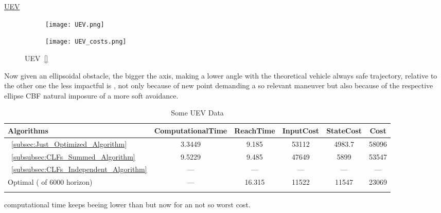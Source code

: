  \newpage %

\underline{UEV}
\label{UEV} %

 \begin{figure}[htbp]
  \begin{subfigure}{0.6\textwidth}
    \centering
    \texttt{[image: UEV.png]}
  \label{fig:UEV_CostEvol}
  \end{subfigure}
  \begin{subfigure}{0.59\textwidth}
    \centering
    \texttt{[image: UEV\_costs.png]}
  \label{fig:UEV_trajectory}
  \end{subfigure}
  \caption{UEV~\ref{}}
\label{fig:UEVTrajectory_and_CostEvol}
\end{figure}

Now given an ellipsoidal obstacle, the bigger the axis, making a lower angle with the theoretical vehicle always safe trajectory, relative to the other one the less impactful is , not only because of new point demanding a so relevant maneuver but also because of the respective ellipse CBF natural imposure of a more soft avoidance. 


 \bgroup
 \begin{xltabular}{\textwidth}{|l|ccccc|}
   \toprule
   Algorithms   & ComputationalTime  & ReachTime  & InputCost   & StateCost & Cost           \\
   \midrule
    ~\ref{subsec:Just_Optimized_Algorithm}           & 3.3449 & 9.185  & 53112 & 4983.7 & 58096 \\
    ~\ref{subsubsec:CLFs_Summed_Algorithm}        & 9.5229  & 9.485     & 47649 & 5899 & 53547 \\
    ~\ref{subsubsec:CLFs_Independent_Algorithm}   & ---   & ---      & ---  & ---  & ---  \\
    Optimal ( of 6000 horizon)                        & ---    & 16.315 & 11522  & 11547 & 23069 \\
    \midrule
    \caption{Some UEV Data}
   \label{tab:Some_UEV_Data}\\
   \end{xltabular}
 \egroup


  computational time keeps beeing lower than  but now for an not so worst cost.


